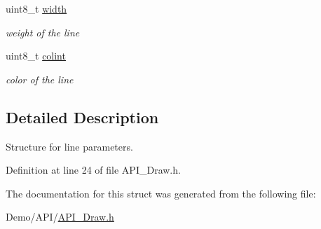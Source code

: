 \begin{DoxyCompactItemize}
\mbox{\label{struct_l_i_n_e_a09a2a45f731b02946ff6d3cd15c1a476}} 
uint8\+\_\+t \hyperlink{struct_l_i_n_e_a09a2a45f731b02946ff6d3cd15c1a476}{width}
\begin{DoxyCompactList}\small\item\em weight of the line \end{DoxyCompactList}\item 
\mbox{\label{struct_l_i_n_e_a21caa4b27a71b7967f1a2d64f196a674}} 
uint8\+\_\+t \hyperlink{struct_l_i_n_e_a21caa4b27a71b7967f1a2d64f196a674}{colint}
\begin{DoxyCompactList}\small\item\em color of the line \end{DoxyCompactList}\end{DoxyCompactItemize}


\subsection{Detailed Description}
Structure for line parameters. 

Definition at line 24 of file A\+P\+I\+\_\+\+Draw.\+h.



The documentation for this struct was generated from the following file\+:\begin{DoxyCompactItemize}
\item 
Demo/\+A\+P\+I/\hyperlink{_a_p_i___draw_8h}{A\+P\+I\+\_\+\+Draw.\+h}\end{DoxyCompactItemize}
